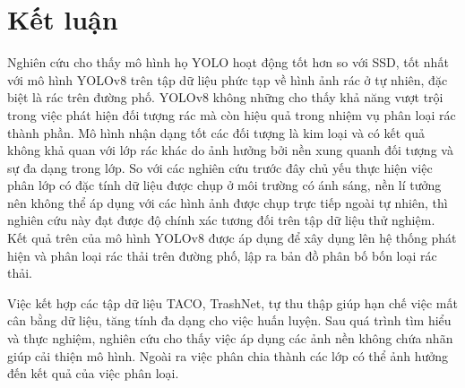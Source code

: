 \documentclass[../the.tex]{subfiles}
\begin{document}
\section{Kết luận}

{\fontsize{13}{12} \selectfont

Nghiên cứu cho thấy mô hình họ YOLO hoạt động tốt hơn so với SSD, tốt nhất với mô hình YOLOv8 trên tập dữ liệu phức tạp về hình ảnh rác ở tự nhiên, đặc biệt là rác trên đường phố.
YOLOv8 không những cho thấy khả năng vượt trội trong việc phát hiện đối tượng rác mà còn hiệu quả trong nhiệm vụ phân loại rác thành phần.
Mô hình nhận dạng tốt các đối tượng là kim loại và có kết quả không khả quan với lớp rác khác do ảnh hưởng bởi nền xung quanh đối tượng và sự đa dạng trong lớp.
So với các nghiên cứu trước đây chủ yếu thực hiện việc phân lớp có đặc tính dữ liệu được chụp ở môi trường có ánh sáng, nền lí tưởng nên không thể áp dụng với các hình ảnh được chụp trực tiếp ngoài tự nhiên, thì nghiên cứu này đạt được độ chính xác tương đối trên tập dữ liệu thử nghiệm.
Kết quả trên của mô hình YOLOv8 được áp dụng để xây dụng lên hệ thống phát hiện và phân loại rác thải trên đường phố, lập ra bản đồ phân bố bốn loại rác thải.

}

\bigskip

{\fontsize{13}{12} \selectfont 
Việc kết hợp các tập dữ liệu TACO, TrashNet, tự thu thập giúp hạn chế việc mất cân bằng dữ liệu, tăng tính đa dạng cho việc huấn luyện.
Sau quá trình tìm hiểu và thực nghiệm, nghiên cứu cho thấy việc áp dụng các ảnh nền không chứa nhãn giúp cải thiện mô hình. Ngoài ra việc phân chia thành các lớp có thể ảnh hưởng đến kết quả của việc phân loại.

}
\end{document}
